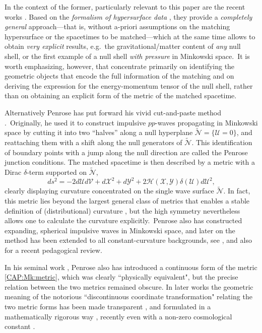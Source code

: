 \documentclass[11pt]{article}
\numberwithin{equation}{section}
\newcommand{\cx}{\mathcal{X}}
\newcommand\N{\mathcal N}
\newcommand{\cu}{\mathcal{U}}
\newcommand{\cv}{\mathcal{V}}
\newcommand{\nullhyp}{\widetilde{\N}}
\begin{document}
In the context of the former, particularly relevant to this paper are the recent works \cite{manzano2021null,manzano2022general,manzano2023matching}. Based on the 
\textit{formalism of hypersurface data} \cite{mars2013constraint,mars2020hypersurface,mars2024abstract}, they provide a \textit{completely general} approach---that is, without 
a-priori assumptions on the matching hypersurface or the spacetimes to be matched---which at the same time allows to obtain \textit{very explicit} results, e.g.\ the 
gravitational/matter content of \textit{any} null shell, or the first example of a null shell \textit{with pressure} in Minkowski space.\ It is worth emphasizing, however, that \cite{manzano2021null,manzano2022general,manzano2023matching} concentrate primarily on identifying the geometric objects that encode the full information of the matching  
and on deriving the expression for the energy-momentum tensor of the null shell, rather than on obtaining an explicit form of the metric of the matched spacetime.
\medskip

Alternatively Penrose has put forward his vivid cut-and-paste method \cite{Penrose:1972xrn}.\ Originally, he used it to construct impulsive $pp$-waves propagating in Minkowski space by cutting it into two ``halves'' along a null hyperplane $\nullhyp=\{\cu=0\}$, and reattaching them with a shift along the null generators of $\nullhyp$. This identification of boundary points with a jump along the null direction are called the Penrose junction conditions. The {matched} spacetime is then described by a metric with a Dirac $\delta$-term supported on $\nullhyp$,
\begin{equation}
	\label{CAP:Mk:metric} ds^2=-2d\cu d\cv+d\cx^2+d\mathcal{Y}^2+2\mathcal{H}(\cx,\mathcal{Y})\delta(\cu)d\cu^2,
\end{equation}
clearly displaying curvature concentrated on the single wave surface $\nullhyp$. In fact, this metric lies beyond the largest general class of metrics that enables a stable definition of (distributional) curvature \cite{geroch1987strings,lefloch2007definition,SV:09}, but the high symmetry nevertheless allows one to calculate the curvature explicitly.\ Penrose also has constructed expanding, spherical impulsive waves in Minkowski space, and later on the method has been extended to all constant-curvature backgrounds, see \cite[Ch.\ 20]{griffiths2009exact}, and also \cite{PS:22} for a recent pedagogical review.
\medskip

In his seminal work \cite{Penrose:1972xrn}, Penrose also has introduced a continuous form of the metric \eqref{CAP:Mk:metric}, which was clearly ``physically equivalent", but the precise relation between the two metrics remained obscure. In later works the geometric meaning of the notorious ``discontinuous coordinate transformation" relating the two metric forms has been made transparent \cite{S:98}, and formulated in a mathematically rigorous way \cite{KS:99}, recently even with a non-zero cosmological constant \cite{podolsky2019cut,samann2023cut}.
\end{document}
